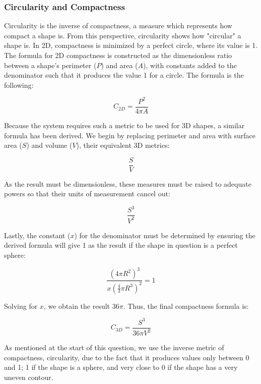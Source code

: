 \documentclass{bigdata}
\begin{document}
\subsubsection{Circularity and Compactness}

Circularity is the inverse of compactness, a measure which represents how compact a shape is. From this perspective, circularity shows how "circular" a shape is. In 2D, compactness is minimized by a perfect circle, where its value is 1. The formula for 2D compactness is constructed as the dimensionless ratio between a shape's perimeter ($P$) and area ($A$), with constants added to the denominator such that it produces the value 1 for a circle. The formula is the following:

\begin{equation}
C_{2D} = \frac{P^2}{4{\pi}A}
\end{equation}

Because the system requires such a metric to be used for 3D shapes, a similar formula has been derived. We begin by replacing perimeter and area with surface area ($S$) and volume ($V$), their equivalent 3D metrics:

\begin{equation}
\frac{S}{V}
\end{equation}

As the result must be dimensionless, these measures must be raised to adequate powers so that their units of measurement cancel out:

\begin{equation}
\frac{S^3}{V^2}
\end{equation}

Lastly, the constant ($x$) for the denominator must be determined by ensuring the derived formula will give 1 as the result if the shape in question is a perfect sphere:

\begin{equation}
\frac{(4\pi R^2)^3}{x(\frac{4}{3}\pi R^3)^2} = 1
\end{equation}

Solving for $x$, we obtain the result 36$\pi$. Thus, the final compactness formula is:

\begin{equation}
C_{3D} = \frac{S^3}{36\pi V^2}
\end{equation}

As mentioned at the start of this question, we use the inverse metric of compactness, circularity, due to the fact that it produces values only between 0 and 1; 1 if the shape is a sphere, and very close to 0 if the shape has a very uneven contour.
\end{document}
